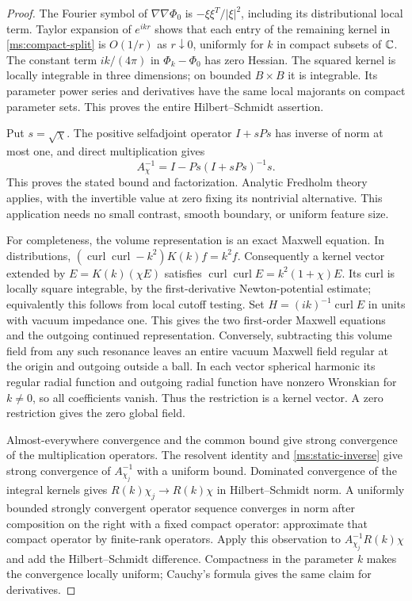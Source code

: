 \begin{proof}
The Fourier symbol of $\nabla\nabla\Phi_0$ is
$-\xi\xi^T/|\xi|^2$, including its distributional local term.
Taylor expansion of $e^{ikr}$ shows that each entry of the
remaining kernel in \eqref{ms:compact-split} is $O(1/r)$ as
$r\downarrow0$, uniformly for $k$ in compact subsets of $\mathbb C$.
The constant term $ik/(4\pi)$ in $\Phi_k-\Phi_0$ has zero Hessian.
The squared kernel is locally integrable in three dimensions;
on bounded $B\times B$ it is integrable.  Its parameter power
series and derivatives have the same local majorants on compact
parameter sets.  This proves the entire Hilbert--Schmidt assertion.

Put $s=\sqrt\chi$.  The positive selfadjoint operator $I+sPs$
has inverse of norm at most one, and direct multiplication gives
\begin{equation}
 A_\chi^{-1}=I-Ps(I+sPs)^{-1}s.
 \label{ms:static-inverse}
\end{equation}
This proves the stated bound and factorization.  Analytic Fredholm
theory applies, with the invertible value at zero fixing its
nontrivial alternative.  This application needs no small contrast,
smooth boundary, or uniform feature size.

For completeness, the volume representation is an exact Maxwell
equation.  In distributions,
$(\operatorname{curl}\operatorname{curl}-k^2)K(k)f=k^2f$.
Consequently a kernel vector extended by $E=K(k)(\chi E)$
satisfies $\operatorname{curl}\operatorname{curl}E
=k^2(1+\chi)E$.  Its curl is locally square integrable, by
the first-derivative Newton-potential estimate; equivalently this
follows from local cutoff testing.  Set $H=(ik)^{-1}\operatorname{curl}E$
in units with vacuum impedance one.  This gives the two first-order
Maxwell equations and the outgoing continued representation.
Conversely, subtracting this volume field from any such resonance
leaves an entire vacuum Maxwell field regular at the origin and
outgoing outside a ball.  In each vector spherical harmonic its
regular radial function and outgoing radial function have nonzero
Wronskian for $k\ne0$, so all coefficients vanish.  Thus the
restriction is a kernel vector.  A zero restriction gives the zero
global field.

Almost-everywhere convergence and the common bound give strong
convergence of the multiplication operators.  The resolvent identity
and \eqref{ms:static-inverse} give strong convergence of $A_{\chi_j}^{-1}$
with a uniform bound.  Dominated convergence of the integral kernels
gives $R(k)\chi_j\to R(k)\chi$ in Hilbert--Schmidt norm.
A uniformly bounded strongly convergent operator sequence converges
in norm after composition on the right with a fixed compact operator:
approximate that compact operator by finite-rank operators.
Apply this observation to $A_{\chi_j}^{-1}R(k)\chi$ and add the
Hilbert--Schmidt difference.  Compactness in the parameter $k$ makes
the convergence locally uniform; Cauchy's formula gives the same
claim for derivatives.
\end{proof}

